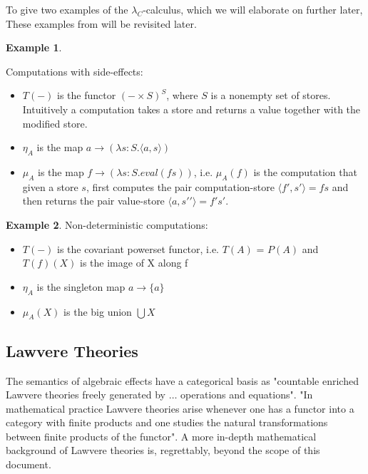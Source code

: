 \documentclass[a4paper,10pt]{article}
\theoremstyle{definition}
\newtheorem{example}{Example}[section]
\begin{document}
To give two examples of the $\lambda_C$-calculus, which we will elaborate on further later,
These examples from \cite{moggi1989computational}\cite{moggi1991notions} will be revisited later.
\vspace{5mm}

\begin{example}\label{lc1}
\end{example}
    Computations with side-effects:
    \begin{itemize}
        \item $T(-)$ is the functor $(-\times S)^S$, where $S$ is a nonempty set of stores.
            Intuitively a computation takes a store and returns a value together with the modified store.
        \item $\eta_A$ is the map $a \rightarrow (\lambda s:S.\langle a,s \rangle)$
        \item $\mu_A$ is the map $f \rightarrow (\lambda s:S.eval(fs))$,
            i.e. $\mu_A(f)$ is the computation that given a store $s$,
            first computes the pair computation-store $\langle f\prime,s\prime\rangle = fs$
            and then returns the pair value-store $\langle a,s\prime\prime\rangle = f\prime s\prime$.
    \end{itemize}
\vspace{5mm}

\begin{example}\label{lc2}
    Non-deterministic computations:
    \begin{itemize}
        \item $T(-)$ is the covariant powerset functor,
            i.e.  $T(A)$ = $P(A)$ and $T(f)(X)$ is the image of X along f
        \item $\eta_A$ is the singleton map $a \rightarrow  \{a\}$
        \item $\mu_A(X)$ is the big union $\bigcup X$
    \end{itemize}
\end{example}

\subsection{Lawvere Theories}
The semantics of algebraic effects have a categorical basis as
"countable enriched Lawvere theories freely generated by $\dots$ operations and equations".
\cite{plotkin2004computational}
"In mathematical practice Lawvere theories arise
whenever one has a functor into a category with finite products
and one studies the natural transformations between finite products of the functor".
\cite{hyland2007category}
A more in-depth mathematical background of Lawvere theories is, regrettably,
beyond the scope of this document.
\end{document}
